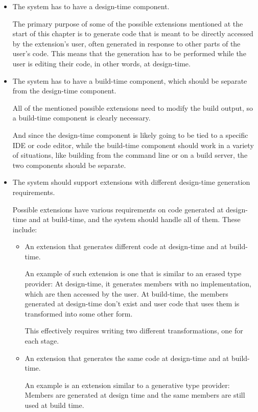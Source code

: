 \begin{itemize}

\item The system has to have a design-time component.

The primary purpose of some of the possible extensions mentioned at the start of this chapter is to generate code that is meant to be directly accessed by the extension's user, often generated in response to other parts of the user's code. This means that the generation has to be performed while the user is editing their code, in other words, at design-time.

\item The system has to have a build-time component, which should be separate from the design-time component.

All of the mentioned possible extensions need to modify the build output, so a build-time component is clearly necessary.

And since the design-time component is likely going to be tied to a specific \ac{IDE} or code editor, while the build-time component should work in a variety of situations, like building from the command line or on a build server, the two components should be separate.

\item The system should support extensions with different design-time generation requirements.

Possible extensions have various requirements on code generated at design-time and at build-time, and the system should handle all of them. These include:

\begin{itemize}
\item An extension that generates different code at design-time and at build-time.

An example of such extension is one that is similar to an erased type provider: At design-time, it generates members with no implementation, which are then accessed by the user. At build-time, the members generated at design-time don't exist and user code that uses them is transformed into some other form.

This effectively requires writing two different transformations, one for each stage.

\item An extension that generates the same code at design-time and at build-time.

An example is an extension similar to a generative type provider: Members are generated at design time and the same members are still used at build time.


\end{itemize}
\end{itemize}

